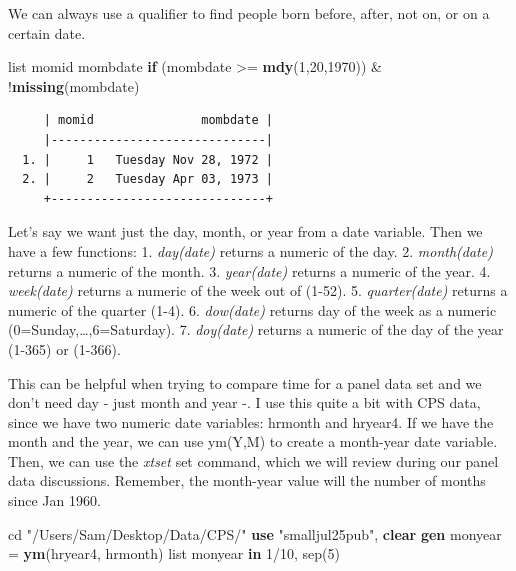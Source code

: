 \documentclass[
]{book}
\newenvironment{Shaded}{\begin{snugshade}}{\end{snugshade}}
\newcommand{\FunctionTok}[1]{\textcolor[rgb]{0.13,0.29,0.53}{\textbf{#1}}}
\newcommand{\KeywordTok}[1]{\textcolor[rgb]{0.13,0.29,0.53}{\textbf{#1}}}
\newcommand{\NormalTok}[1]{#1}
\newcommand{\OtherTok}[1]{\textcolor[rgb]{0.56,0.35,0.01}{#1}}
\newcommand{\StringTok}[1]{\textcolor[rgb]{0.31,0.60,0.02}{#1}}
\begin{document}
We can always use a qualifier to find people born before, after, not on, or on a certain date.

\begin{Shaded}
\begin{Highlighting}[]
\OtherTok{list}\NormalTok{ momid mombdate }\KeywordTok{if}\NormalTok{ (mombdate \textgreater{}= }\FunctionTok{mdy}\NormalTok{(1,20,1970)) \& !}\FunctionTok{missing}\NormalTok{(mombdate)}
\end{Highlighting}
\end{Shaded}

\begin{verbatim}
     | momid               mombdate |
     |------------------------------|
  1. |     1   Tuesday Nov 28, 1972 |
  2. |     2   Tuesday Apr 03, 1973 |
     +------------------------------+
\end{verbatim}

Let's say we want just the day, month, or year from a date variable. Then we have a few functions:
1. \emph{day(date)} returns a numeric of the day.
2. \emph{month(date)} returns a numeric of the month.
3. \emph{year(date)} returns a numeric of the year.
4. \emph{week(date)} returns a numeric of the week out of (1-52).
5. \emph{quarter(date)} returns a numeric of the quarter (1-4).
6. \emph{dow(date)} returns day of the week as a numeric (0=Sunday,\ldots,6=Saturday).
7. \emph{doy(date)} returns a numeric of the day of the year (1-365) or (1-366).

This can be helpful when trying to compare time for a panel data set and we don't need day - just month and year -. I use this quite a bit with CPS data, since we have two numeric date variables: hrmonth and hryear4. If we have the month and the year, we can use ym(Y,M) to create a month-year date variable. Then, we can use the \emph{xtset} set command, which we will review during our panel data discussions. Remember, the month-year value will the number of months since Jan 1960.

\begin{Shaded}
\begin{Highlighting}[]
\NormalTok{cd }\StringTok{"/Users/Sam/Desktop/Data/CPS/"}
\KeywordTok{use} \StringTok{"smalljul25pub"}\NormalTok{, }\KeywordTok{clear}
\KeywordTok{gen}\NormalTok{ monyear = }\FunctionTok{ym}\NormalTok{(hryear4, hrmonth)}
\OtherTok{list}\NormalTok{ monyear }\KeywordTok{in}\NormalTok{ 1/10, sep(5)}
\end{Highlighting}
\end{Shaded}
\end{document}
